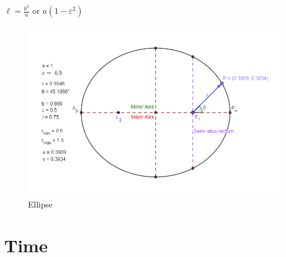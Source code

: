 \documentclass{article}
\begin{document}
$ \ell = \frac{b^2}{a} $ or $ a (1-\varepsilon^2) $

\begin{figure}[h]
	\centering
	\includegraphics[width=0.9\linewidth]{ellipse}
	\caption{Ellipse}
	\label{fig:ellipse}
\end{figure}
\pagebreak

\section{Time}
\end{document}
